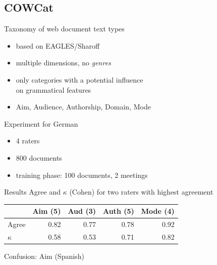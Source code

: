 \subsection{COWCat}

\begin{frame}
  {Taxonomy of web document text types}
  \begin{itemize}
    \item based on EAGLES/Sharoff
    \item multiple dimensions, no \textit{genres}
    \item only categories with a potential influence\\on grammatical features
    \item Aim, Audience, Authorship, Domain, Mode
  \end{itemize}
\end{frame}

\begin{frame}
  {Experiment for German}
  \begin{itemize}
    \item 4 raters
    \item 800 documents
    \item training phase: 100 documents, 2 meetings
  \end{itemize}
\end{frame}

\begin{frame}
  {Results}
  Agree and $\kappa$ (Cohen) for two raters with highest agreement
  \vspace{0.5cm}
  \begin{center}
    \begin{tabular}[h]{lrrrr}
      \hline
      & Aim (5) & Aud (3) & Auth (5) & Mode (4) \\
      \hline
      \hline
      Agree & 0.82 & 0.77 & 0.78 & 0.92 \\
      $\kappa$ & 0.58 & 0.53 & 0.71 & 0.82 \\
      \hline
    \end{tabular}
  \end{center}
\end{frame}

\begin{frame}
  {Confusion: Aim (Spanish)}
  \vspace{0.5cm}
  \begin{center}
  \end{center}
\end{frame}

